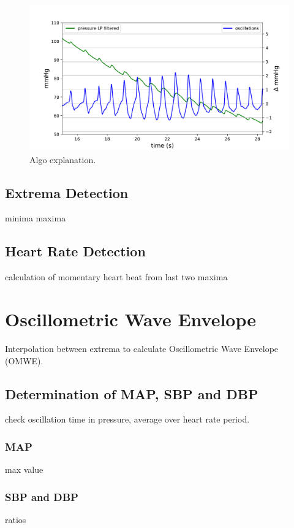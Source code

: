 \begin{figure}[ht]
\centering
\includegraphics[width=\textwidth]{figures/algo_detail.pdf}
\caption{Algo explanation.}
\label{fig:algoDetail}
\end{figure}
\subsection{Extrema Detection}
minima
maxima

\subsection{Heart Rate Detection}
calculation of momentary heart beat from last two maxima



\section{Oscillometric Wave Envelope}
Interpolation between extrema to calculate Oscillometric Wave Envelope (OMWE).

\subsection{Determination of MAP, SBP and DBP}
check oscillation time in pressure, average over heart rate period.
\subsubsection{MAP}
max value
\subsubsection{SBP and DBP}
ratios
